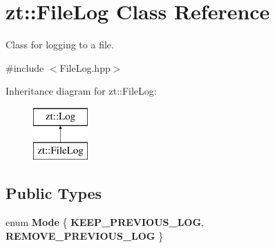 \hypertarget{classzt_1_1_file_log}{}\section{zt\+:\+:File\+Log Class Reference}
\label{classzt_1_1_file_log}


Class for logging to a file.  




{\ttfamily \#include $<$File\+Log.\+hpp$>$}

Inheritance diagram for zt\+:\+:File\+Log\+:\begin{figure}[H]
\begin{center}
\leavevmode
\includegraphics[height=2.000000cm]{classzt_1_1_file_log}
\end{center}
\end{figure}
\subsection*{Public Types}
\begin{DoxyCompactItemize}
\item 
\mbox{\label{classzt_1_1_file_log_a9cfc1f53da3e577208c3559c7bf2bc2c}} 
enum {\bfseries Mode} \{ {\bfseries K\+E\+E\+P\+\_\+\+P\+R\+E\+V\+I\+O\+U\+S\+\_\+\+L\+OG}, 
{\bfseries R\+E\+M\+O\+V\+E\+\_\+\+P\+R\+E\+V\+I\+O\+U\+S\+\_\+\+L\+OG}
 \}
\end{DoxyCompactItemize}
